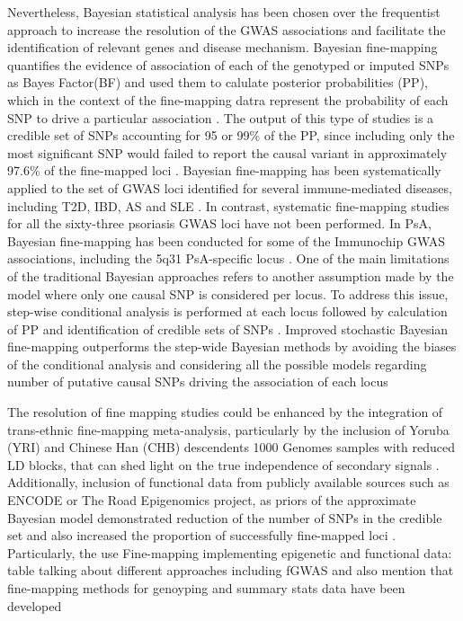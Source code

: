 Nevertheless, Bayesian statistical analysis has been chosen over the frequentist approach to increase the resolution of the GWAS associations and facilitate the identification of relevant genes and disease mechanism. Bayesian fine-mapping quantifies the evidence of association of each of the genotyped or imputed SNPs as Bayes Factor(BF) and used them to calulate posterior probabilities (PP), which in the context of the fine-mapping datra represent the probability of each SNP to drive a particular association \parencite{Wakefield2007}. The output of this type of studies is a credible set of SNPs accounting for 95 or 99\% of the PP, since including only the most significant SNP would failed to report the causal variant in approximately 97.6\% of the fine-mapped loci \parencite{Bunt2015}. Bayesian fine-mapping has been systematically applied to the set of GWAS loci identified for several immune-mediated diseases, including T2D, IBD, AS and SLE \parencite{Maller2012,Gaulton2015,Bunt2015,Sun2016,Huang2017}. In contrast, systematic fine-mapping studies for all the sixty-three psoriasis GWAS loci have not been performed. In PsA, Bayesian fine-mapping has been conducted for some of the Immunochip GWAS associations, including the 5q31 PsA-specific locus  \parencite{Bowes2015}. One of the main limitations of the traditional Bayesian approaches refers to another assumption made by the model where only one causal SNP is considered per locus. To address this issue, step-wise conditional analysis is performed at each locus followed by calculation of PP and identification of credible sets of SNPs  . Improved stochastic Bayesian fine-mapping outperforms the step-wide Bayesian methods by avoiding the biases of the conditional analysis and considering all the possible models regarding number of putative causal SNPs driving the association of each locus \parencite{}

The resolution of fine mapping studies could be enhanced by the integration of trans-ethnic fine-mapping meta-analysis, particularly by the inclusion of Yoruba (YRI) and Chinese Han (CHB) descendents 1000 Genomes samples with reduced LD blocks, that can shed light on the true independence of secondary signals \parencite{Bunt2015, Kichaev2015}. Additionally, inclusion of functional data from publicly available sources such as ENCODE or The Road Epigenomics project, as priors of the approximate Bayesian model demonstrated reduction of the number of SNPs in the credible set and also increased the proportion of successfully fine-mapped loci \parencite{Bunt2015, Kichaev2015}. Particularly, the use
Fine-mapping implementing epigenetic and functional data: table talking about different approaches including fGWAS and also mention that fine-mapping methods for genoyping and summary stats data have been developed

